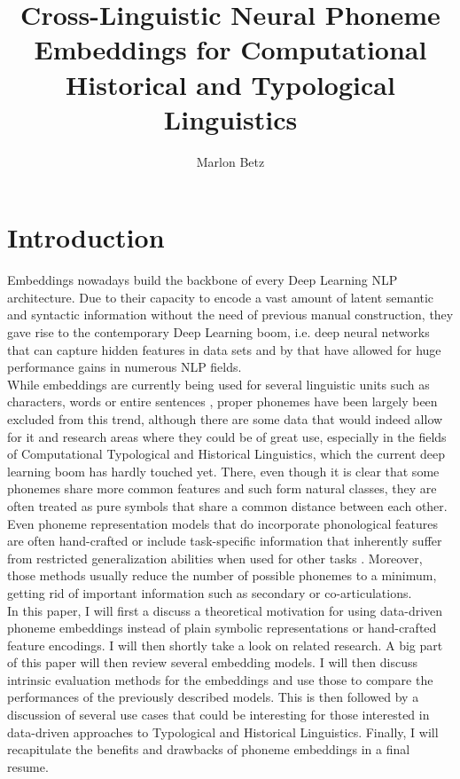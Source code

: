 \documentclass[11pt]{article}
\title{Cross-Linguistic Neural Phoneme Embeddings for Computational Historical and Typological Linguistics}
\author{Marlon Betz}
\begin{document}
\maketitle
\newpage
\tableofcontents

\section{Introduction}
Embeddings nowadays build the backbone of every Deep Learning NLP architecture. Due to their capacity to encode a vast amount of latent semantic and syntactic information without the need of previous manual construction, they gave rise to the contemporary Deep Learning boom, i.e. deep neural networks that can capture hidden features in data sets and by that have allowed for huge performance gains in numerous NLP fields. \\While embeddings are currently being used for several linguistic units such as characters\cite{kim2015character,dos2014learning,zhang2015character}, words \cite{mikolov2013efficient,mikolov2013distributed,pennington2014glove} or entire sentences \cite{kiros2015skip}, proper phonemes have been largely been excluded from this trend, although there are some data that would indeed allow for it and research areas where they could be of great use, especially in the fields of Computational Typological and Historical Linguistics, which the current deep learning boom has hardly touched yet. There, even though it is clear that some phonemes share more common features and such form natural classes, they are often treated as pure symbols that share a common distance between each other. Even phoneme representation models that do incorporate phonological features are often hand-crafted \cite{kondrak2000new,rama2016siamese} or include task-specific information that inherently suffer from restricted generalization abilities when used for other tasks \cite{jager2014phylogenetic}. Moreover, those methods usually reduce the number of possible phonemes to a minimum, getting rid of important information such as secondary or co-articulations. \\
In this paper, I will first a discuss a theoretical motivation for using data-driven phoneme embeddings instead of plain symbolic representations or hand-crafted feature encodings. I will then shortly take a look on related research. A big part of this paper will then review several embedding models. I will then discuss intrinsic evaluation methods for the embeddings and use those to compare the performances of the previously described models. This is then followed by a discussion of several use cases that could be interesting for those interested in data-driven approaches to Typological and Historical Linguistics. Finally, I will recapitulate the benefits and drawbacks of phoneme embeddings in a final resume.
\end{document}
